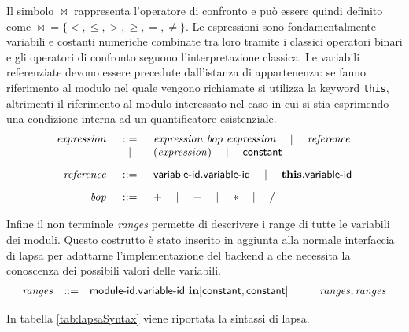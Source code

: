 Il simbolo $\bowtie$ rappresenta l'operatore di confronto e può essere quindi definito come $\bowtie = \{<,\leq,>,\geq, =, \neq\}$. Le espressioni sono fondamentalmente variabili e costanti numeriche combinate tra loro tramite i classici operatori binari e gli operatori di confronto seguono l'interpretazione classica.
Le variabili referenziate devono essere precedute dall'istanza di appartenenza: se fanno riferimento al modulo nel quale vengono richiamate si utilizza la keyword \texttt{this}, altrimenti il riferimento al modulo interessato nel caso in cui si stia esprimendo una condizione interna ad un quantificatore esistenziale.
$$
\begin{array}{rcl}
	\mathit{expression} &::=& \mathit{expression} \mbox{ } \mathit{bop} \mbox{ } \mathit{expression} \quad\mid\quad \mathit{reference} \\
	& \quad\mid\quad & (\mathit{expression}) \quad\mid\quad {\sf constant}
	\\[.3cm]
	\mathit{reference} &::=& {\sf variable}\textrm{-}{\sf id}.{\sf variable}\textrm{-}{\sf id} \quad\mid\quad \mathbf{this}\mathbf{.}{\sf variable}\textrm{-}{\sf id}
	\\[.3cm]
	\mathit{bop} &::=& + \quad\mid\quad - \quad\mid\quad * \quad\mid\quad \slash
	\\
\end{array}
$$

Infine il non terminale \emph{ranges} permette di descrivere i range di tutte le variabili dei moduli. Questo costrutto è stato inserito in aggiunta alla normale interfaccia di \ac{lapsa} per adattarne l'implementazione del backend a \prism{} che necessita la conoscenza dei possibili valori delle variabili.
$$
\begin{array}{rcl}
	\mathit{ranges} &::=& {\sf module}\textrm{-}{\sf id}.{\sf variable}\textrm{-}{\sf id} \mbox{ } \mathbf{in} [{\sf constant}, {\sf constant}] \quad\mid\quad \mathit{ranges}, \mathit{ranges} \\
\end{array}
$$

In tabella \ref{tab:lapsaSyntax} viene riportata la sintassi di \ac{lapsa}.

